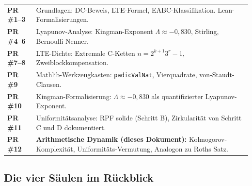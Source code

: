 \documentclass[12pt,a4paper]{article}
\begin{document}
\begin{tcolorbox}[saeulen, title={16 Dokumente, 12 PRs: Die Grenzbefestigung}]
\begin{center}
\renewcommand{\arraystretch}{1.4}
\begin{tabular}{>{\bfseries}l >{\raggedright\arraybackslash}p{9cm}}
\toprule
PR \#1--3 & Grundlagen: DC-Beweis, LTE-Formel, EABC-Klassifikation.
            Lean-Formalisierungen. \\[2pt]
PR \#4--6 & Lyapunov-Analyse: Kingman-Exponent $\Lambda \approx -0{,}830$,
            Stirling, Bernoulli-Nenner. \\[2pt]
PR \#7--8 & LTE-Dichte: Extremale C-Ketten $n = 2^{k+1}3^r - 1$,
            Zweiblockkompensation. \\[2pt]
PR \#9    & Mathlib-Werkzeugkasten: \texttt{padicValNat}, Vierquadrate,
            von-Staudt-Clausen. \\[2pt]
PR \#10   & Kingman-Formalisierung: $\Lambda \approx -0{,}830$ als
            quantifizierter Lyapunov-Exponent. \\[2pt]
PR \#11   & Uniformitätsanalyse: RPF solide (Schritt B), Zirkularität
            von Schritt C und D dokumentiert. \\[2pt]
PR \#12   & \textbf{Arithmetische Dynamik (dieses Dokument):}
            Kolmogorov-Komplexität, Uniformitäts-Vermutung,
            Analogon zu Roths Satz. \\[2pt]
\bottomrule
\end{tabular}
\end{center}
\end{tcolorbox}

\subsection*{Die vier Säulen im Rückblick}
\end{document}
